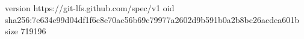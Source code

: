 version https://git-lfs.github.com/spec/v1
oid sha256:7e634e99d04df1f6c8e70ac56b69c79977a2602d9b591b0a2b8bc26acdea601b
size 719196
